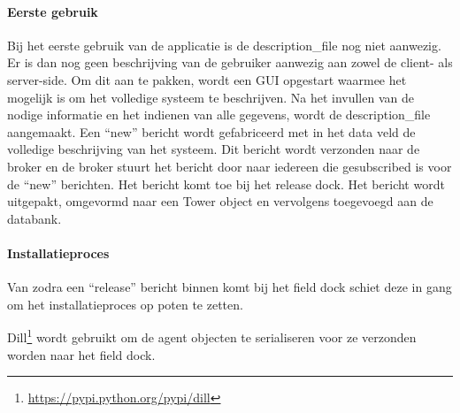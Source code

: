 \paragraph{Eerste gebruik}
Bij het eerste gebruik van de applicatie is de description\_file nog niet aanwezig.
Er is dan nog geen beschrijving van de gebruiker aanwezig aan zowel de client- als server-side.
Om dit aan te pakken, wordt een GUI opgestart waarmee het mogelijk is om het volledige systeem te beschrijven.
Na het invullen van de nodige informatie en het indienen van alle gegevens, wordt de description\_file aangemaakt.
Een ``new'' bericht wordt gefabriceerd met in het data veld de volledige beschrijving van het systeem.
Dit bericht wordt verzonden naar de broker en de broker stuurt het bericht door naar iedereen die gesubscribed is voor de ``new'' berichten.
Het bericht komt toe bij het release dock.
Het bericht wordt uitgepakt, omgevormd naar een Tower object en vervolgens toegevoegd aan de databank.

\paragraph{Installatieproces}
Van zodra een ``release'' bericht binnen komt bij het field dock schiet deze in gang om het installatieproces op poten te zetten.

Dill\footnote{\url{https://pypi.python.org/pypi/dill}} wordt gebruikt om de agent objecten te serialiseren voor ze verzonden worden naar het field dock.

